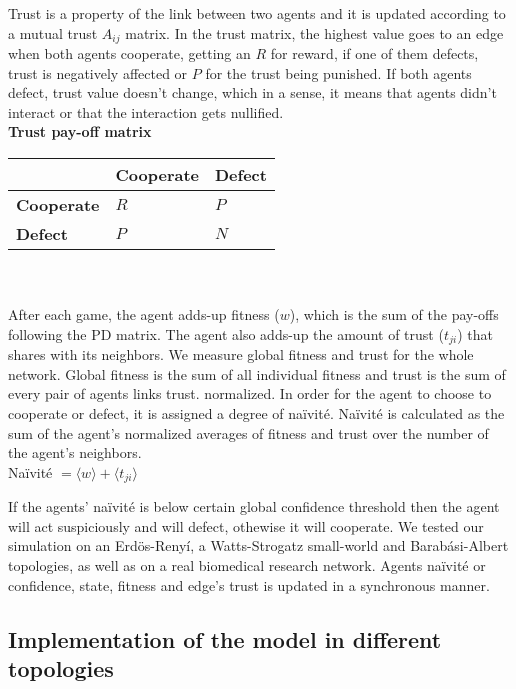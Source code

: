 Trust is a property of the link between two agents and it is updated
according to a mutual trust $A_{ij}$ matrix. In the trust matrix, the
highest value goes to an edge when both agents cooperate, getting an
$R$ for reward, if one of them defects, trust is negatively affected
or $P$ for the trust being punished. If both agents defect, trust
value doesn't change, which in a sense, it means that agents didn't
interact or that the interaction gets nullified. \\

{\bf Trust pay-off matrix}\\

\begin{tabular}{| l | l | l |}
\hline
          & \bf{Cooperate} & \bf{Defect} \\ \hline
\bf{Cooperate} &  $R$      &  $P$   \\ \hline
\bf{Defect}    &  $P$      &  $N$   \\ \hline

\end{tabular}\\ \\


After each game, the agent adds-up fitness ($w$), which is the sum of the
pay-offs following the PD matrix. The agent also adds-up the amount of
trust ($t_{ji}$) that shares with its neighbors. We measure global
fitness and trust for the whole network. Global fitness is the sum of
all individual fitness and trust is the sum of every pair of agents
links trust. normalized. In order for the agent to choose to cooperate
or defect, it is assigned a degree of na\"{i}vit\'e. Na\"{i}vit\'e is
calculated as the sum of the agent's normalized averages of fitness
and trust over the number of the agent's neighbors.\\


Na\"{i}vit\'e $= \langle w \rangle +  \langle t_{ji} \rangle$

If the agents' na\"{i}vit\'e is below certain global confidence threshold then
the agent will act suspiciously and will defect, othewise it will
cooperate. We tested our simulation on an Erd\"{o}s-Reny\'i, a
Watts-Strogatz small-world and Barab\'asi-Albert topologies, as well
as on a real biomedical research network. Agents na\"{i}vit\'e or
confidence, state, fitness and edge's trust is updated in a
synchronous manner.   

\subsection{Implementation of the model in different topologies}


